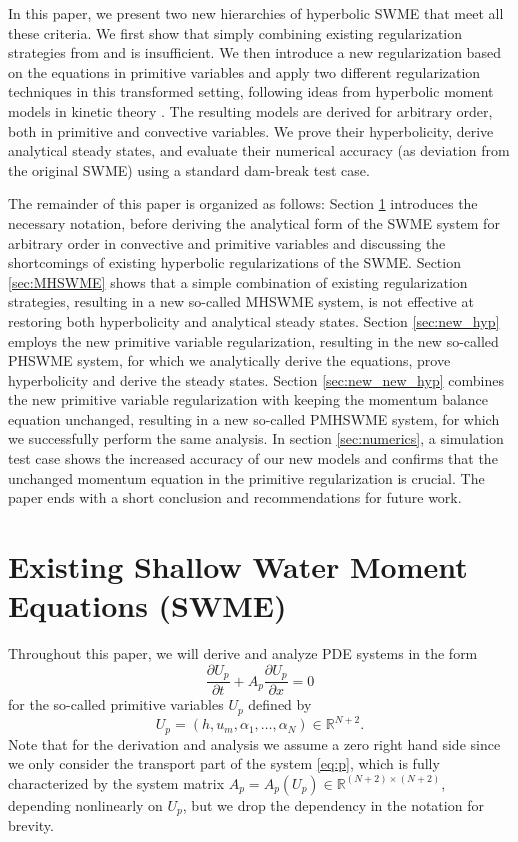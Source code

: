 \documentclass[a4paper, 11pt]{article}
\begin{document}
In this paper, we present two new hierarchies of hyperbolic SWME that meet all these criteria. We first show that simply combining existing regularization strategies from \cite{Koellermeier2020c} and \cite{Koellermeier2020i} is insufficient. We then introduce a new regularization based on the equations in primitive variables and apply two different regularization techniques in this transformed setting, following ideas from hyperbolic moment models in kinetic theory \cite{Koellermeier2017d}. The resulting models are derived for arbitrary order, both in primitive and convective variables. We prove their hyperbolicity, derive analytical steady states, and evaluate their numerical accuracy (as deviation from the original SWME) using a standard dam-break test case.

The remainder of this paper is organized as follows:
Section \ref{sec:SWME} introduces the necessary notation, before deriving the analytical form of the SWME system for arbitrary order in convective and primitive variables and discussing the shortcomings of existing hyperbolic regularizations of the SWME.
Section \ref{sec:MHSWME} shows that a simple combination of existing regularization strategies, resulting in a new so-called MHSWME system, is not effective at restoring both hyperbolicity and analytical steady states.
Section \ref{sec:new_hyp} employs the new primitive variable regularization, resulting in the new so-called  PHSWME system, for which we analytically derive the equations, prove hyperbolicity and derive the steady states.
Section \ref{sec:new_new_hyp} combines the new primitive variable regularization with keeping the momentum balance equation unchanged, resulting in a new so-called PMHSWME system, for which we successfully perform the same analysis.
In section \ref{sec:numerics}, a simulation test case shows the increased accuracy of our new models and confirms that the unchanged momentum equation in the primitive regularization is crucial. The paper ends with a short conclusion and recommendations for future work.

\section{Existing Shallow Water Moment Equations (SWME)}
\label{sec:SWME}
Throughout this paper, we will derive and analyze PDE systems in the form
\begin{equation}\label{eq:p}
    \frac{\partial U_{p}}{\partial t} + A_{p} \frac{\partial U_{p}}{\partial x} = 0
\end{equation}
for the so-called primitive variables $U_{p}$ defined by
\begin{equation}\label{eq:p_vars}
    U_{p} =(h, u_m, \alpha_1, \ldots, \alpha_N) \in \mathbb{R}^{N+2}.
\end{equation}
Note that for the derivation and analysis we assume a zero right hand side since we only consider the transport part of the system \eqref{eq:p}, which is fully characterized by the system matrix $A_{p}=A_{p}(U_{p}) \in \mathbb{R}^{(N+2)\times(N+2)}$, depending nonlinearly on $U_{p}$, but we drop the dependency in the notation for brevity.
\end{document}
